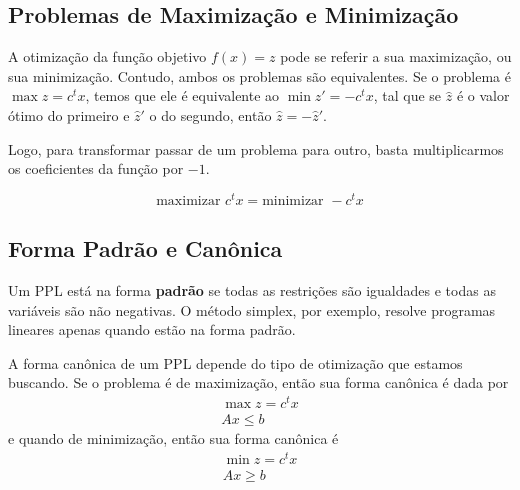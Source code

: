 \subsection{Problemas de Maximização e Minimização}

A otimização da função objetivo $f(x) = z$ pode se referir a sua maximização, ou sua minimização. Contudo, ambos os problemas são equivalentes. Se o problema é $\max z = c^tx$, temos que ele é equivalente ao $ \min z' = -c^tx $, tal que se $\hat{z}$ é o valor ótimo do primeiro e $\hat{z}'$ o do segundo, então $\hat{z} = -\hat{z}'$. 

Logo, para transformar passar de um problema para outro, basta multiplicarmos os coeficientes da função por $-1$.

\begin{equation*}
	\text{maximizar\ } c^tx = \text{minimizar\ } -c^tx
\end{equation*}

\subsection{Forma Padrão e Canônica}
Um PPL está na forma \textbf{padrão} se todas as restrições são igualdades e todas as variáveis são não negativas. O método simplex, por exemplo, resolve programas lineares apenas quando estão na forma padrão.

A forma canônica de um PPL depende do tipo de otimização que estamos buscando. Se o problema é de maximização, então sua forma canônica é dada por
\begin{gather*}
	\max z = c^tx \\
	Ax \leq b
\end{gather*}
e quando de minimização, então sua forma canônica é
\begin{gather*}
	\min z = c^tx \\
	Ax \geq b
\end{gather*}